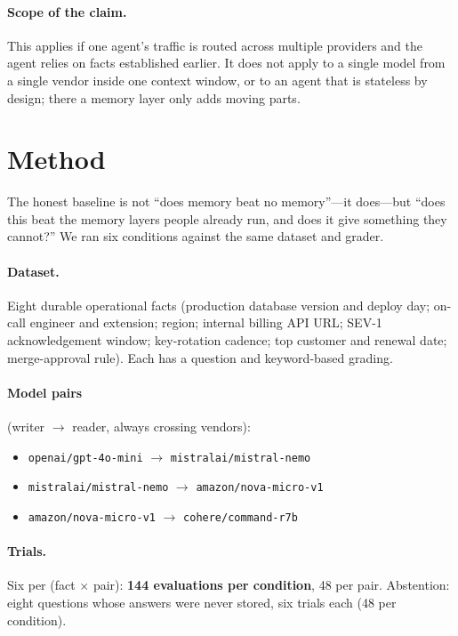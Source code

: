 \documentclass[11pt]{article}
\begin{document}
\paragraph{Scope of the claim.} This applies if one agent's traffic is routed across
multiple providers and the agent relies on facts established earlier. It does not apply to a
single model from a single vendor inside one context window, or to an agent that is
stateless by design; there a memory layer only adds moving parts.

\section{Method}\label{sec:method}

The honest baseline is not ``does memory beat no memory''---it does---but ``does this beat
the memory layers people already run, and does it give something they cannot?'' We ran six
conditions against the same dataset and grader.

\paragraph{Dataset.} Eight durable operational facts (production database version and deploy
day; on-call engineer and extension; region; internal billing API URL; SEV-1
acknowledgement window; key-rotation cadence; top customer and renewal date; merge-approval
rule). Each has a question and keyword-based grading.

\paragraph{Model pairs} (writer $\rightarrow$ reader, always crossing vendors):
\begin{itemize}[topsep=1pt,itemsep=0pt,leftmargin=1.4em]
\item \texttt{openai/gpt-4o-mini} $\rightarrow$ \texttt{mistralai/mistral-nemo}
\item \texttt{mistralai/mistral-nemo} $\rightarrow$ \texttt{amazon/nova-micro-v1}
\item \texttt{amazon/nova-micro-v1} $\rightarrow$ \texttt{cohere/command-r7b}
\end{itemize}

\paragraph{Trials.} Six per (fact $\times$ pair): \textbf{144 evaluations per condition},
48 per pair. Abstention: eight questions whose answers were never stored, six trials each
(48 per condition).
\end{document}
